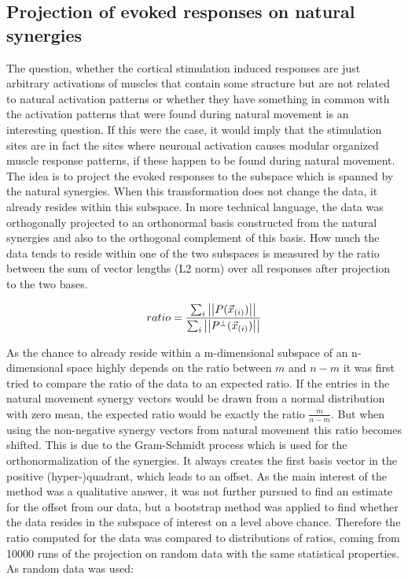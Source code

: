 \subsection{Projection of evoked responses on natural synergies} %
\label{sg:sub:projection}

The question, whether the cortical stimulation induced responses are just arbitrary activations of muscles that contain some structure but are not related to natural activation patterns or whether they have something in common with the activation patterns that were found during natural movement is an interesting question. If this were the case, it would imply that the stimulation sites are in fact the sites where neuronal activation causes modular organized muscle response patterns, if these happen to be found during natural movement. The idea is to project the evoked responses to the subspace which is spanned by the natural synergies. When this transformation does not change the data, it already resides within this subspace. In more technical language, the data was orthogonally projected to an orthonormal basis constructed from the natural synergies and also to the orthogonal complement of this basis. How much the data tends to reside within one of the two subspaces is measured by the ratio between the sum of vector lengths (L2 norm) over all responses after projection to the two bases.

\begin{equation}
	ratio = \frac
		{\sum_{i} \left|\left|P(\vec{x}_{(i)})\right|\right|} 
		{\sum_{i} \left|\left|P^{\perp}(\vec{x}_{(i)})\right|\right|}
\end{equation}

As the chance to already reside within a m-dimensional subspace of an n-dimensional space highly depends on the ratio between $m$ and $n - m$ it was first tried to compare the ratio of the data to an expected ratio. If the entries in the natural movement synergy vectors would be drawn from a normal distribution with zero mean, the expected ratio would be exactly the ratio $\frac{m}{n - m}$. But when using the non-negative synergy vectors from natural movement this ratio becomes shifted. This is due to the Gram-Schmidt process which is used for the orthonormalization of the synergies. It always creates the first basis vector in the positive (hyper-)quadrant, which leads to an offset. As the main interest of the method was a qualitative answer, it was not further pursued to find an estimate for the offset from our data, but a bootstrap method was applied to find whether the data resides in the subspace of interest on a level above chance. Therefore the ratio computed for the data was compared to distributions of ratios, coming from 10000 runs of the projection on random data with the same statistical properties. As random data was used:

